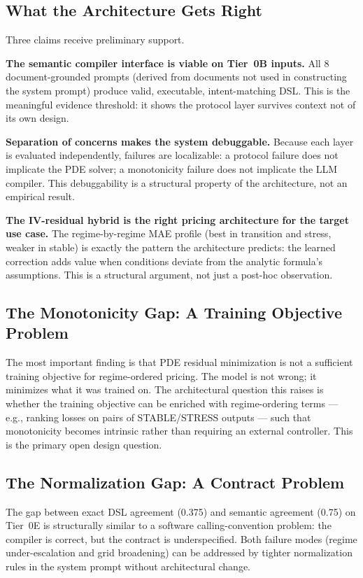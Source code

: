 \documentclass[11pt,a4paper]{article}
\begin{document}
\subsection{What the Architecture Gets Right}

Three claims receive preliminary support.

\textbf{The semantic compiler interface is viable on Tier~0B inputs.} All 8
document-grounded prompts (derived from documents not used in constructing the system
prompt) produce valid, executable, intent-matching DSL. This is the meaningful evidence
threshold: it shows the protocol layer survives context not of its own design.

\textbf{Separation of concerns makes the system debuggable.} Because each layer is
evaluated independently, failures are localizable: a protocol failure does not implicate
the PDE solver; a monotonicity failure does not implicate the LLM compiler. This
debuggability is a structural property of the architecture, not an empirical result.

\textbf{The IV-residual hybrid is the right pricing architecture for the target use
case.} The regime-by-regime MAE profile (best in transition and stress, weaker in
stable) is exactly the pattern the architecture predicts: the learned correction adds
value when conditions deviate from the analytic formula's assumptions. This is a
structural argument, not just a post-hoc observation.

\subsection{The Monotonicity Gap: A Training Objective Problem}

The most important finding is that PDE residual minimization is not a sufficient
training objective for regime-ordered pricing. The model is not wrong; it minimizes
what it was trained on. The architectural question this raises is whether the training
objective can be enriched with regime-ordering terms --- e.g., ranking losses on pairs
of STABLE/STRESS outputs --- such that monotonicity becomes intrinsic rather than
requiring an external controller. This is the primary open design question.

\subsection{The Normalization Gap: A Contract Problem}

The gap between exact DSL agreement (0.375) and semantic agreement (0.75) on Tier~0E
is structurally similar to a software calling-convention problem: the compiler is
correct, but the contract is underspecified. Both failure modes (regime under-escalation
and grid broadening) can be addressed by tighter normalization rules in the system
prompt without architectural change.
\end{document}
